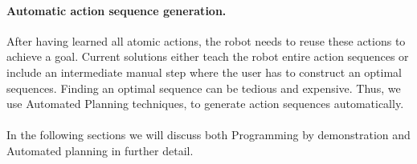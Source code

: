 \paragraph{Automatic action sequence generation.}
After having learned all atomic actions, the robot needs to reuse these actions to achieve a goal.
Current solutions either teach the robot entire action sequences or include an intermediate manual step where the user has to construct an optimal sequences.
Finding an optimal sequence can be tedious and expensive.
Thus, we use Automated Planning techniques, to generate action sequences automatically.

\paragraph{}
In the following sections we will discuss both Programming by demonstration and Automated planning in further detail.